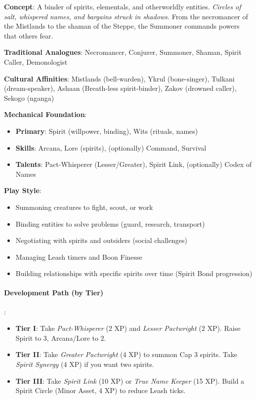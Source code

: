 \textbf{Concept}: A binder of spirits, elementals, and otherworldly entities. \emph{Circles of salt, whispered names, and bargains struck in shadows.} From the necromancer of the Mistlands to the shaman of the Steppe, the Summoner commands powers that others fear.

\textbf{Traditional Analogues}: Necromancer, Conjurer, Summoner, Shaman, Spirit Caller, Demonologist

\textbf{Cultural Affinities}: Mistlands (bell-warden), Ykrul (bone-singer), Tulkani (dream-speaker), Ashaan (Breath-less spirit-binder), Zakov (drowned caller), Sekogo (nganga)

\textbf{Mechanical Foundation}:
\begin{itemize}
\item \textbf{Primary}: Spirit (willpower, binding), Wits (rituals, names)
\item \textbf{Skills}: Arcana, Lore (spirits), (optionally) Command, Survival
\item \textbf{Talents}: Pact-Whisperer (Lesser/Greater), Spirit Link, (optionally) Codex of Names
\end{itemize}

\textbf{Play Style}:
\begin{itemize}
\item Summoning creatures to fight, scout, or work
\item Binding entities to solve problems (guard, research, transport)
\item Negotiating with spirits and outsiders (social challenges)
\item Managing Leash timers and Boon Finesse
\item Building relationships with specific spirits over time (Spirit Bond progression)
\end{itemize}

\paragraph{Development Path (by Tier)}:
\begin{itemize}
\item \textbf{Tier I}: Take \emph{Pact-Whisperer} (2 XP) and \emph{Lesser Pactwright} (2 XP). Raise Spirit to 3, Arcana/Lore to 2.
\item \textbf{Tier II}: Take \emph{Greater Pactwright} (4 XP) to summon Cap 3 spirits. Take \emph{Spirit Synergy} (4 XP) if you want two spirits.
\item \textbf{Tier III}: Take \emph{Spirit Link} (10 XP) or \emph{True Name Keeper} (15 XP). Build a Spirit Circle (Minor Asset, 4 XP) to reduce Leash ticks.
\end{itemize}

